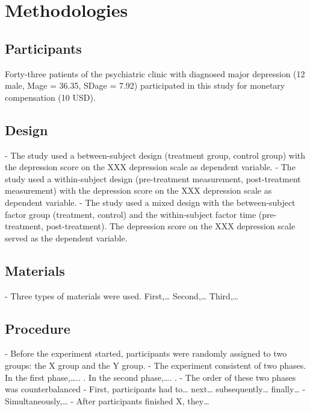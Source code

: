 \chapter{Methodologies}

\section{Participants}
\label{participants}

Forty-three patients of the psychiatric clinic with diagnosed major depression (12 male, Mage = 36.35, SDage = 7.92) participated in this study for monetary compensation (10 USD).

\section{Design}
\label{design}

- The study used a between-subject design (treatment group, control group) with the
depression score on the XXX depression scale as dependent variable.
- The study used a within-subject design (pre-treatment measurement, post-treatment
measurement) with the depression score on the XXX depression scale as dependent variable.
- The study used a mixed design with the between-subject factor group (treatment, control) and the within-subject factor time (pre-treatment, post-treatment). The depression score on the XXX depression scale served as the dependent variable.

\section{Materials}
\label{materials}

- Three types of materials were used. First,… Second,… Third,…

\section{Procedure}
\label{procedure}

- Before the experiment started, participants were randomly assigned to two groups: the X group and the Y group.
- The experiment consistent of two phases. In the first phase,….. . In the second phase,…. .
- The order of these two phases was counterbalanced
- First, participants had to… next… subsequently… finally…
- Simultaneously,…
- After participants finished X, they… \citep{martins_human_2019} %

